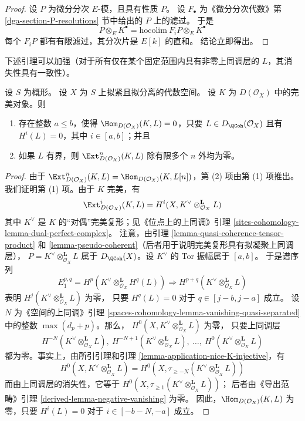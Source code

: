 \begin{proof}
设 $P$ 为微分分次 $E$-模，且具有性质 $P$。%
设 $F_\bullet$ 为《微分分次代数》第
\ref{dga-section-P-resolutions} 节中给出的 $P$ 上的滤过。
于是
$$
P \otimes_E K^\bullet = \text{hocolim}\ F_iP \otimes_E K^\bullet
$$
每个 $F_iP$ 都有有限滤过，其分次片是 $E[k]$ 的直和。
结论立即得出。
\end{proof}

\noindent
下述引理可以加强（对于所有仅在某个固定范围内具有非零上同调层的
$L$，其消失性具有一致性）。

\begin{lemma}
\label{lemma-ext-from-perfect-into-bounded-QCoh}
设 $S$ 为概形。
设 $X$ 为 $S$ 上拟紧且拟分离的代数空间。
设 $K$ 为 $D(\mathcal{O}_X)$ 中的完美对象。则
\begin{enumerate}
\item 存在整数 $a \leq b$，使得
$\Hom_{D(\mathcal{O}_X)}(K, L) = 0$，只要
$L \in D_\QCoh(\mathcal{O}_X)$ 且有 $H^i(L) = 0$，其中
$i \in [a, b]$；并且
\item 如果 $L$ 有界，则 $\Ext^n_{D(\mathcal{O}_X)}(K, L)$
除有限多个 $n$ 外均为零。
\end{enumerate}
\end{lemma}

\begin{proof}
由于 $\Ext^n_{D(\mathcal{O}_X)}(K, L) =
\Hom_{D(\mathcal{O}_X)}(K, L[n])$，第 (2) 项由第 (1) 项推出。
我们证明第 (1) 项。由于 $K$ 完美，有
$$
\Ext^i_{D(\mathcal{O}_X)}(K, L) =
H^i(X, K^\vee \otimes_{\mathcal{O}_X}^\mathbf{L} L)
$$
其中 $K^\vee$ 是 $K$ 的“对偶”完美复形；见《位点上的上同调》引理
\ref{sites-cohomology-lemma-dual-perfect-complex}。
注意，由引理 \ref{lemma-quasi-coherence-tensor-product} 和
\ref{lemma-pseudo-coherent}（后者用于说明完美复形具有拟凝聚上同调层），
$P = K^\vee \otimes_{\mathcal{O}_X}^\mathbf{L} L$
属于 $D_\QCoh(X)$。设 $K^\vee$ 的 Tor 振幅属于 $[a, b]$。
于是谱序列
$$
E_1^{p, q} = H^p(K^\vee \otimes_{\mathcal{O}_X}^\mathbf{L} H^q(L))
\Rightarrow
H^{p + q}(K^\vee \otimes_{\mathcal{O}_X}^\mathbf{L} L)
$$
表明 $H^j(K^\vee \otimes_{\mathcal{O}_X}^\mathbf{L} L)$ 为零，
只要 $H^q(L) = 0$ 对于 $q \in [j - b, j - a]$ 成立。
设 $N$ 为《空间的上同调》引理
\ref{spaces-cohomology-lemma-vanishing-quasi-separated}
中的整数 $\max(d_p + p)$。那么，
$H^0(X, K^\vee \otimes_{\mathcal{O}_X}^\mathbf{L} L)$ 为零，
只要上同调层
$$
H^{-N}(K^\vee \otimes_{\mathcal{O}_X}^\mathbf{L} L),
\ H^{-N + 1}(K^\vee \otimes_{\mathcal{O}_X}^\mathbf{L} L),
\ \ldots,
\ H^0(K^\vee \otimes_{\mathcal{O}_X}^\mathbf{L} L)
$$
都为零。事实上，由所引引理和引理
\ref{lemma-application-nice-K-injective}，有
$$
H^0(X, K^\vee \otimes_{\mathcal{O}_X}^\mathbf{L} L) =
H^0(X, \tau_{\geq -N}(K^\vee \otimes_{\mathcal{O}_X}^\mathbf{L} L))
$$
而由上同调层的消失性，它等于
$H^0(X, \tau_{\geq 1}(K^\vee \otimes_{\mathcal{O}_X}^\mathbf{L} L))$；
后者由《导出范畴》引理
\ref{derived-lemma-negative-vanishing} 为零。
因此，$\Hom_{D(\mathcal{O}_X)}(K, L)$ 为零，只要
$H^i(L) = 0$ 对于 $i \in [-b - N, -a]$ 成立。
\end{proof}


